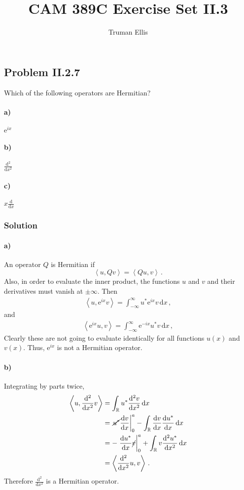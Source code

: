 \documentclass[letterpaper,10pt]{article}
\title{CAM 389C Exercise Set II.3}
\author{Truman Ellis}
\def\expect#1{\left\langle #1\right\rangle}
\def\d{\mathrm{d}}
\def\e{\mathrm{e}}
\begin{document}
\maketitle

\subsection*{Problem II.2.7}
Which of the following operators are Hermitian?\\[.5ex]

\paragraph*{a)} $\displaystyle \e^{ix}$

\paragraph*{b)} $\displaystyle \frac{\d^2}{\d x^2}$

\paragraph*{c)} $\displaystyle x\frac{\d}{\d x}$

\subsubsection*{Solution}
\paragraph*{a)} An operator $Q$ is Hermitian if
\[
\expect{u,Qv}=\expect{Qu,v}\,.
\]
Also, in order to evaluate the inner product, the functions $u$ and $v$ and
their derivatives must vanish at $\pm\infty$. Then
\begin{align*}
\expect{u,\e^{ix}v}=\int_{-\infty}^\infty u^*\e^{ix}v\,\d x\,,
\end{align*}
and
\begin{align*}
\expect{\e^{ix}u,v}=\int_{-\infty}^\infty \e^{-ix}u^*v\,\d x\,,
\end{align*}
Clearly these are not going to evaluate identically for all functions $u(x)$
and $v(x)$. Thus, $\e^{ix}$ is not a Hermitian operator.

\paragraph*{b)}
Integrating by parts twice,
\begin{align*}
\expect{u,\frac{\d^2}{\d x^2}v}&=\int_\mathbb{R}u^*\frac{\d^2v}{\d x^2}\,\d x\\
&=\left.\cancel{u^*}\frac{\d v}{\d x}\right|_0^a
-\int_\mathbb{R}\frac{\d v}{\d x}\frac{\d u^*}{\d x}\,\d x\\
&=-\left.\frac{\d u^*}{\d x}\cancel{v}\right|_0^a
+\int_\mathbb{R}v\frac{\d^2u^*}{\d x^2}\,\d x\\
&=\expect{\frac{\d^2}{\d x^2}u,v}\,.
\end{align*}
Therefore $\frac{\d^2}{\d x^2}$ is a Hermitian operator.
\end{document}
